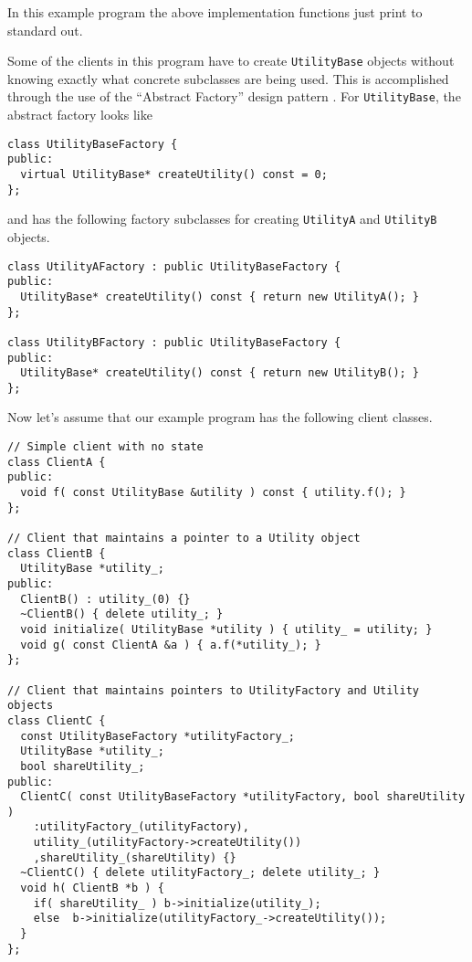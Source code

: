 \documentclass[pdf,ps2pdf,11pt]{SANDreport}
\begin{document}
{}\noindent{}In this example program the above implementation
functions just print to standard out.

Some of the clients in this program have to create
{}\texttt{Utility\-Base} objects without knowing exactly what concrete
subclasses are being used.  This is accomplished through the use of
the ``Abstract Factory'' design pattern {}\cite{ref:gama_et_al_1995}.
For {}\texttt{Utility\-Base}, the abstract factory looks like

{\small\begin{verbatim}
class UtilityBaseFactory {
public:
  virtual UtilityBase* createUtility() const = 0;
};
\end{verbatim}}

{}\noindent{}and has the following factory subclasses for creating
{}\texttt{Utility\-A} and {}\texttt{Utility\-B} objects.

{\small\begin{verbatim}
class UtilityAFactory : public UtilityBaseFactory {
public:
  UtilityBase* createUtility() const { return new UtilityA(); }
};

class UtilityBFactory : public UtilityBaseFactory {
public:
  UtilityBase* createUtility() const { return new UtilityB(); }
};
\end{verbatim}}

Now let's assume that our example program has the following client
classes.

{\small\begin{verbatim}
// Simple client with no state
class ClientA {
public:
  void f( const UtilityBase &utility ) const { utility.f(); }
};

// Client that maintains a pointer to a Utility object 
class ClientB {
  UtilityBase *utility_;
public:
  ClientB() : utility_(0) {}
  ~ClientB() { delete utility_; }
  void initialize( UtilityBase *utility ) { utility_ = utility; }
  void g( const ClientA &a ) { a.f(*utility_); }
};

// Client that maintains pointers to UtilityFactory and Utility objects
class ClientC {
  const UtilityBaseFactory *utilityFactory_;
  UtilityBase *utility_;
  bool shareUtility_;
public:
  ClientC( const UtilityBaseFactory *utilityFactory, bool shareUtility )
    :utilityFactory_(utilityFactory),
    utility_(utilityFactory->createUtility())
    ,shareUtility_(shareUtility) {}
  ~ClientC() { delete utilityFactory_; delete utility_; }
  void h( ClientB *b ) {
    if( shareUtility_ ) b->initialize(utility_);
    else  b->initialize(utilityFactory_->createUtility());
  }
};
\end{verbatim}}
\end{document}
